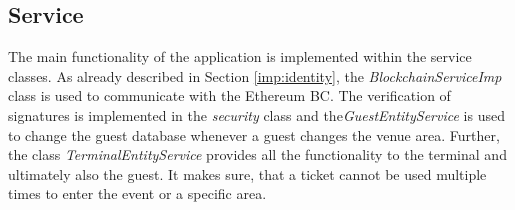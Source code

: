 \subsection{Service}

The main functionality of the application is implemented within the service classes. As already described in Section \ref{imp:identity}, the \textit{BlockchainServiceImp} class is used to communicate with the Ethereum BC.
The verification of signatures is implemented in the \textit{security} class and the\textit{GuestEntityService} is used to change the guest database whenever a guest changes the venue area. 
Further, the class \textit{TerminalEntityService} provides all the functionality to the terminal and ultimately also the guest. It makes sure, that a ticket cannot be used multiple times to enter the event or a specific area.
